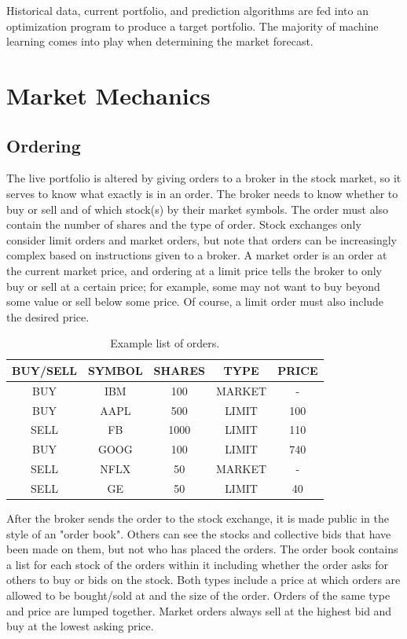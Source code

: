 Historical data, current portfolio, and prediction algorithms are fed into an optimization program to produce a target portfolio. The majority of machine learning comes into play when determining the market forecast. 

\section{Market Mechanics}

\subsection{Ordering}
The live portfolio is altered by giving orders to a broker in the stock market, so it serves to know what exactly is in an order. The broker needs to know whether to buy or sell and of which stock(s) by their market symbols. The order must also contain the number of shares and the type of order. Stock exchanges only consider limit orders and market orders, but note that orders can be increasingly complex based on instructions given to a broker. A market order is an order at the current market price, and ordering at a limit price tells the broker to only buy or sell at a certain price; for example, some may not want to buy beyond some value or sell below some price. Of course, a limit order must also include the desired price. \\

\begin{table}[h!]
\centering
\begin{tabular}{c|c|c|c|c}
BUY/SELL & SYMBOL & SHARES & TYPE & PRICE \\
\hline
BUY & IBM & 100 & MARKET & - \\
BUY & AAPL & 500 & LIMIT & 100 \\
SELL & FB & 1000 & LIMIT & 110 \\
BUY & GOOG & 100 & LIMIT & 740 \\
SELL & NFLX & 50 & MARKET & - \\
SELL & GE & 50 & LIMIT & 40 \\
\end{tabular}
\caption{Example list of orders.}
\end{table}

After the broker sends the order to the stock exchange, it is made public in the style of an "order book". Others can see the stocks and collective bids that have been made on them, but not who has placed the orders. The order book contains a list for each stock of the orders within it including whether the order asks for others to buy or bids on the stock. Both types include a price at which orders are allowed to be bought/sold at and the size of the order. Orders of the same type and price are lumped together. Market orders always sell at the highest bid and buy at the lowest asking price. \\

